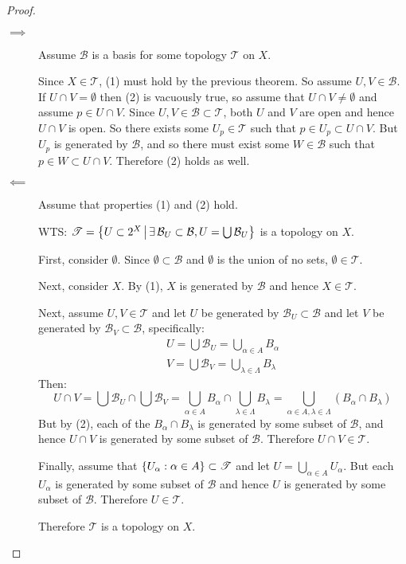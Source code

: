 \documentclass[letterpaper,12pt,fleqn]{article}
\newcommand{\T}{\mathscr{T}}
\newcommand{\B}{\mathcal{B}}
\renewcommand{\a}{\alpha}
\newcommand{\A}{A}
\renewcommand{\l}{\lambda}
\renewcommand{\L}{\Lambda}
\begin{document}
\begin{proof}
  \begin{description}
  \item[]
  \item[\(\implies\)] Assume \(\B\) is a basis for some topology \(\T\) on \(X\).

    Since \(X\in\T\), (1) must hold by the previous theorem.  So assume \(U,V\in\B\).  If \(U\cap V=\emptyset\)
    then (2) is vacuously true, so assume that \(U\cap V\ne\emptyset\) and assume \(p\in U\cap V\).  Since
    \(U,V\in\B\subset\T\), both \(U\) and \(V\) are open and hence \(U\cap V\) is open.  So there exists some
    \(U_p\in\T\) such that \(p\in U_p\subset U\cap V\).  But \(U_p\) is generated by \(\B\), and so there must
    exist some \(W\in\B\) such that \(p\in W\subset U\cap V\).  Therefore (2) holds as well.

  \item[\(\impliedby\)] Assume that properties (1) and (2) hold.

    WTS: \(\T=\setb{U\subset2^X}{\exists\,\B_U\subset\B,U=\bigcup\B_U}\) is a topology on \(X\).

    First, consider \(\emptyset\).  Since \(\emptyset\subset\B\) and \(\emptyset\) is the union of no sets,
    \(\emptyset\in\T\).

    Next, consider \(X\).  By (1), \(X\) is generated by \(\B\) and hence \(X\in\T\).

    Next, assume \(U,V\in\T\) and let \(U\) be generated by \(\B_U\subset\B\) and let \(V\) be generated by
    \(\B_V\subset\B\), specifically:
    \begin{gather*}
      U=\bigcup\B_U=\bigcup_{\a\in\A}B_{\a} \\
      V=\bigcup\B_V=\bigcup_{\l\in\L}B_{\l}
    \end{gather*}
    Then:
    \[U\cap V=\bigcup\B_U\cap\bigcup\B_V=\bigcup_{\a\in\A}B_{\a}\cap\bigcup_{\l\in\L}B_{\l}=
    \bigcup_{\a\in\A,\l\in\L}(B_{\a}\cap B_{\l})\]
    But by (2), each of the \(B_{\a}\cap B_{\l}\) is generated by some subset of \(\B\), and hence \(U\cap V\) is
    generated by some subset of \(\B\).  Therefore \(U\cap V\in\T\).

    Finally, assume that \(\set{U_{\a}:\a\in\A}\subset\T\) and let \(U=\bigcup_{\a\in\A}U_{\a}\).  But each \(U_{\a}\)
    is generated by some subset of \(\B\) and hence \(U\) is generated by some subset of \(\B\).  Therefore
    \(U\in\T\).

    Therefore \(\T\) is a topology on \(X\).
  \end{description}
\end{proof}
\end{document}
